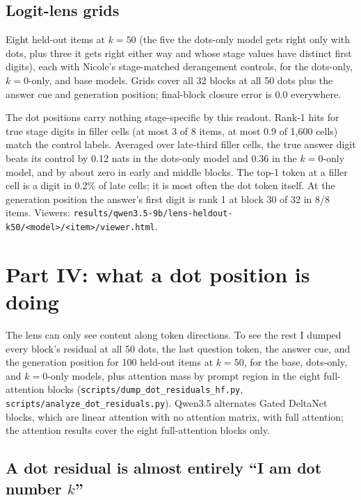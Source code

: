 \documentclass[11pt]{article}
\newcommand{\ttt}[1]{\texttt{\small #1}}
\begin{document}
\subsection{Logit-lens grids}

Eight held-out items at $k=50$ (the five the dots-only model gets right only with dots, plus three it gets right either way and whose stage values have distinct first digits), each with Nicole's stage-matched derangement controls, for the dots-only, $k=0$-only, and base models. Grids cover all 32 blocks at all 50 dots plus the answer cue and generation position; final-block closure error is 0.0 everywhere.

The dot positions carry nothing stage-specific by this readout. Rank-1 hits for true stage digits in filler cells (at most 3 of 8 items, at most 0.9 of 1,600 cells) match the control labels. Averaged over late-third filler cells, the true answer digit beats its control by 0.12 nats in the dots-only model and 0.36 in the $k=0$-only model, and by about zero in early and middle blocks. The top-1 token at a filler cell is a digit in 0.2\% of late cells; it is most often the dot token itself. At the generation position the answer's first digit is rank 1 at block 30 of 32 in 8/8 items. Viewers: \ttt{results/\allowbreak qwen3.5-9b/\allowbreak lens-heldout-k50/\allowbreak <model>/\allowbreak <item>/\allowbreak viewer.html}.

\section{Part IV: what a dot position is doing}

The lens can only see content along token directions. To see the rest I dumped every block's residual at all 50 dots, the last question token, the answer cue, and the generation position for 100 held-out items at $k=50$, for the base, dots-only, and $k=0$-only models, plus attention mass by prompt region in the eight full-attention blocks (\ttt{scripts/dump\_dot\_residuals\_hf.py}, \ttt{scripts/analyze\_dot\_residuals.py}). Qwen3.5 alternates Gated DeltaNet blocks, which are linear attention with no attention matrix, with full attention; the attention results cover the eight full-attention blocks only.

\subsection{A dot residual is almost entirely ``I am dot number $k$''}
\end{document}
